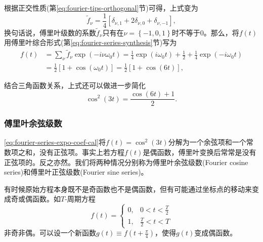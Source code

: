 根据正交性质(第\ref{eq:fourier-tips-orthogonal}节)可得，上式变为
\begin{equation*}
  \tilde{f}_{\nu} = \frac{1}{4}
  \left[
  \delta_{\nu,1} + 2 \delta_{\nu,0} + \delta_{\nu,-1}
  \right],
\end{equation*}
换句话说，傅里叶级数的系数$\tilde{f}_{\nu}$只有在$\nu = \left\{ -1, 0 ,1 \right\}$时不等于$0$。那么，将$f(t)$用傅里叶综合形式(第\ref{eq:fourier-series-synthesis}节)写为
\begin{equation}
  \label{eq:fourier-series-expo-coef-cal}
  \begin{split}
    f(t) & = \sum_{\nu} \tilde{f}_{\nu} \exp \left( - i \nu \omega_{0} t \right) = \frac{1}{4} \exp \left(i \omega_{0} t \right) + \frac{1}{2} + \frac{1}{4} \exp \left( - i \omega_{0} t \right) \\
    & = \frac{1}{2} \left[ 1 + \cos \left( \omega_{0} t \right) \right] = \frac{1}{2} \left[ 1 + \cos \left( 6 t \right) \right],
  \end{split}
\end{equation}

结合三角函数关系，上式还可以做进一步简化
\begin{equation*}
  \cos^{2} \left(3 t \right) = \frac{\cos \left( 6 t \right) + 1}{2}.
\end{equation*}

\subsubsection{傅里叶余弦级数}
\label{sec:fourier-series-sin-coef}

\eqref{eq:fourier-series-expo-coef-cal}将$f(t) = \cos^{2} \left( 3t \right)$分解为一个余弦项和一个常数项之和，没有正弦项。事实上若方程$f(t)$是偶函数，傅里叶变换后常常是没有正弦项的。反之亦然。我们将两种情况分别称为傅里叶余弦级数(Fourier cosine series)和傅里叶正弦级数(Fourier sine series)。

有时候原始方程本身既不是奇函数也不是偶函数，但有可能通过坐标点的移动来变成奇或偶函数。如$T$-周期方程
\begin{equation*}
  f(t) = \begin{cases}
  0, & 0 < t < \frac{T}{2}\\
  1, & \frac{T}{2} < t < T
  \end{cases}
\end{equation*}
非奇非偶。可以设一个新函数$g(t) \equiv f \left( t + \frac{\pi}{4} \right)$，使得$g(t)$变成偶函数。

